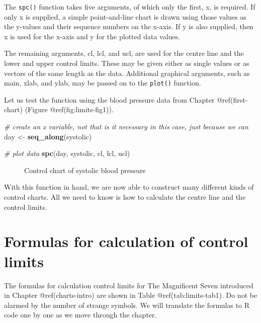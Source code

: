 \documentclass[
]{book}
\makeatletter
\newenvironment{Shaded}{\begin{snugshade}}{\end{snugshade}}
\newcommand{\CommentTok}[1]{\textcolor[rgb]{0.56,0.35,0.01}{\textit{#1}}}
\newcommand{\FunctionTok}[1]{\textcolor[rgb]{0.13,0.29,0.53}{\textbf{#1}}}
\newcommand{\NormalTok}[1]{#1}
\newcommand{\OtherTok}[1]{\textcolor[rgb]{0.56,0.35,0.01}{#1}}
\newcommand*\pandocbounded[1]{%
  \sbox\pandoc@box{#1}%
  \Gscale@div\@tempa{\textheight}{\dimexpr\ht\pandoc@box+\dp\pandoc@box\relax}%
  \Gscale@div\@tempb{\linewidth}{\wd\pandoc@box}%
  \ifdim\@tempb\p@<\@tempa\p@\let\@tempa\@tempb\fi%
  \ifdim\@tempa\p@<\p@\scalebox{\@tempa}{\usebox\pandoc@box}%
  \else\usebox{\pandoc@box}%
  \fi%
}
\makeatother
\begin{document}
The \texttt{spc()} function takes five arguments, of which only the
first, x, is required. If only x is supplied, a simple point-and-line
chart is drawn using those values as the y-values and their sequence
numbers on the x-axis. If y is also supplied, then x is used for the
x-axis and y for the plotted data values.

The remaining arguments, cl, lcl, and ucl, are used for the centre line
and the lower and upper control limits. These may be given either as
single values or as vectors of the same length as the data. Additional
graphical arguments, such as main, xlab, and ylab, may be passed on to
the \texttt{plot()} function.

Let us test the function using the blood pressure data from Chapter
@ref(first-chart) (Figure @ref(fig:limits-fig1)).

\begin{Shaded}
\begin{Highlighting}[]
\CommentTok{\# create an x variable, not that is it necessary in this case, just because we can}
\NormalTok{day }\OtherTok{\textless{}{-}} \FunctionTok{seq\_along}\NormalTok{(systolic)}

\CommentTok{\# plot data}
\FunctionTok{spc}\NormalTok{(day, systolic, cl, lcl, ucl)}
\end{Highlighting}
\end{Shaded}

\begin{figure}
\centering
\pandocbounded{}
\caption{Control chart of systolic blood pressure}
\end{figure}

With this function in hand, we are now able to construct many different
kinds of control charts. All we need to know is how to calculate the
centre line and the control limits.

\section{Formulas for calculation of control
limits}\label{formulas-for-calculation-of-control-limits}

The formulas for calculation control limits for The Magnificent Seven
introduced in Chapter @ref(charts-intro) are shown in Table
@ref(tab:limits-tab1). Do not be alarmed by the number of strange
symbols. We will translate the formulas to R code one by one as we move
through the chapter.
\end{document}

